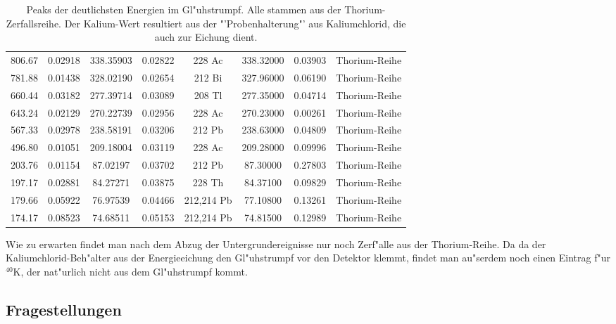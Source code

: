 \documentclass[12pt]{article}
\begin{document}
\begin{table}[h!]
{\begin{tabular}{cccccccc}
			\rowcolor[rgb]{ .949,  .949,  .949} 806.67 & 0.02918 & 338.35903 & 0.02822 & 228 Ac & 338.32000 & 0.03903 & Thorium-Reihe \\
			781.88 & 0.01438 & 328.02190 & 0.02654 & 212 Bi & 327.96000 & 0.06190 & Thorium-Reihe \\
			\rowcolor[rgb]{ .949,  .949,  .949} 660.44 & 0.03182 & 277.39714 & 0.03089 & 208 Tl & 277.35000 & 0.04714 & Thorium-Reihe \\
			643.24 & 0.02129 & 270.22739 & 0.02956 & 228 Ac & 270.23000 & 0.00261 & Thorium-Reihe \\
			\rowcolor[rgb]{ .949,  .949,  .949} 567.33 & 0.02978 & 238.58191 & 0.03206 & 212 Pb & 238.63000 & 0.04809 & Thorium-Reihe \\
			496.80 & 0.01051 & 209.18004 & 0.03119 & 228 Ac & 209.28000 & 0.09996 & Thorium-Reihe \\
			\rowcolor[rgb]{ .949,  .949,  .949} 203.76 & 0.01154 & 87.02197 & 0.03702 & 212 Pb & 87.30000 & 0.27803 & Thorium-Reihe \\
			197.17 & 0.02881 & 84.27271 & 0.03875 & 228 Th & 84.37100 & 0.09829 & Thorium-Reihe \\
			\rowcolor[rgb]{ .949,  .949,  .949} 179.66 & 0.05922 & 76.97539 & 0.04466 & 212,214 Pb & 77.10800 & 0.13261 & Thorium-Reihe \\
			174.17 & 0.08523 & 74.68511 & 0.05153 & 212,214 Pb & 74.81500 & 0.12989 & Thorium-Reihe \\
		\end{tabular}%
	}
	\caption{Peaks der deutlichsten Energien im Gl"uhstrumpf. Alle stammen aus der Thorium-Zerfallsreihe. Der Kalium-Wert resultiert aus der "'Probenhalterung"' aus Kaliumchlorid, die auch zur Eichung dient.}
	\label{tab:addlabel}%
\end{table}%
\noindent
Wie zu erwarten findet man nach dem Abzug der Untergrundereignisse nur noch Zerf"alle aus der Thorium-Reihe. Da da der Kaliumchlorid-Beh"alter aus der Energieeichung den Gl"uhstrumpf vor den Detektor klemmt, findet man au"serdem noch einen Eintrag f"ur $^{40}$K, der nat"urlich nicht aus dem Gl"uhstrumpf kommt.

\subsection{Fragestellungen}
\end{document}
